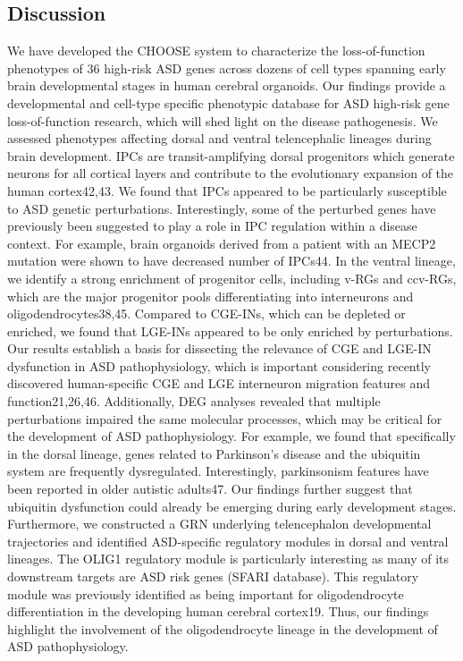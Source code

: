 

\subsection{Discussion}
We have developed the CHOOSE system to characterize the loss-of-function phenotypes of 36 high-risk ASD genes across dozens of cell types spanning early brain developmental stages in human cerebral organoids. Our findings provide a developmental and cell-type specific phenotypic database for ASD high-risk gene loss-of-function research, which will shed light on the disease pathogenesis.
We assessed phenotypes affecting dorsal and ventral telencephalic lineages during brain development. IPCs are transit-amplifying dorsal progenitors which generate neurons for all cortical layers and contribute to the evolutionary expansion of the human cortex42,43. We found that IPCs appeared to be particularly susceptible to ASD genetic perturbations. Interestingly, some of the perturbed genes have previously been suggested to play a role in IPC regulation within a disease context. For example, brain organoids derived from a patient with an MECP2 mutation were shown to have decreased number of IPCs44. 
In the ventral lineage, we identify a strong enrichment of progenitor cells, including v-RGs and ccv-RGs, which are the major progenitor pools differentiating into interneurons and oligodendrocytes38,45. Compared to CGE-INs, which can be depleted or enriched, we found that LGE-INs appeared to be only enriched by perturbations. Our results establish a basis for dissecting the relevance of CGE and LGE-IN dysfunction in ASD pathophysiology, which is important considering recently discovered human-specific CGE and LGE interneuron migration features and function21,26,46.
Additionally, DEG analyses revealed that multiple perturbations impaired the same molecular processes, which may be critical for the development of ASD pathophysiology. For example, we found that specifically in the dorsal lineage, genes related to Parkinson’s disease and the ubiquitin system are frequently dysregulated. Interestingly, parkinsonism features have been reported in older autistic adults47. Our findings further suggest that ubiquitin dysfunction could already be emerging during early development stages. Furthermore, we constructed a GRN underlying telencephalon developmental trajectories and identified ASD-specific regulatory modules in dorsal and ventral lineages. The OLIG1 regulatory module is particularly interesting as many of its downstream targets are ASD risk genes (SFARI database). This regulatory module was previously identified as being important for oligodendrocyte differentiation in the developing human cerebral cortex19. Thus, our findings highlight the involvement of the oligodendrocyte lineage in the development of ASD pathophysiology.
